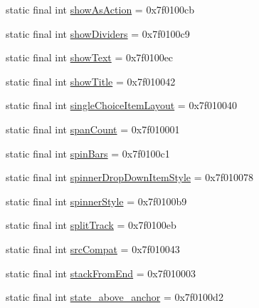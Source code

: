 \begin{CompactItemize}
\item 
static final int \hyperlink{classandroid_1_1support_1_1v7_1_1recyclerview_1_1_r_1_1attr_c968408fd2b62031f0d570d80099277d}{showAsAction} = 0x7f0100cb
\item 
static final int \hyperlink{classandroid_1_1support_1_1v7_1_1recyclerview_1_1_r_1_1attr_ac1710dac02f10a25d240e4053510474}{showDividers} = 0x7f0100c9
\item 
static final int \hyperlink{classandroid_1_1support_1_1v7_1_1recyclerview_1_1_r_1_1attr_340febbd8c8ff19124695033ff537e6f}{showText} = 0x7f0100ec
\item 
static final int \hyperlink{classandroid_1_1support_1_1v7_1_1recyclerview_1_1_r_1_1attr_da4b45088744653f30ee7b49cad0b15b}{showTitle} = 0x7f010042
\item 
static final int \hyperlink{classandroid_1_1support_1_1v7_1_1recyclerview_1_1_r_1_1attr_3668a9127cf32623817179d35f58f1b5}{singleChoiceItemLayout} = 0x7f010040
\item 
static final int \hyperlink{classandroid_1_1support_1_1v7_1_1recyclerview_1_1_r_1_1attr_4bcb72056cb55ba5a2d95cb14c6bd950}{spanCount} = 0x7f010001
\item 
static final int \hyperlink{classandroid_1_1support_1_1v7_1_1recyclerview_1_1_r_1_1attr_afba810e0a4736dddd963565713eefea}{spinBars} = 0x7f0100c1
\item 
static final int \hyperlink{classandroid_1_1support_1_1v7_1_1recyclerview_1_1_r_1_1attr_2a3b9afca71a7c0bb792c6c7ff64828d}{spinnerDropDownItemStyle} = 0x7f010078
\item 
static final int \hyperlink{classandroid_1_1support_1_1v7_1_1recyclerview_1_1_r_1_1attr_fae4501ae9f1ca3c650256e8af893aec}{spinnerStyle} = 0x7f0100b9
\item 
static final int \hyperlink{classandroid_1_1support_1_1v7_1_1recyclerview_1_1_r_1_1attr_8e2c92cb3138805145e8120cb089ecd8}{splitTrack} = 0x7f0100eb
\item 
static final int \hyperlink{classandroid_1_1support_1_1v7_1_1recyclerview_1_1_r_1_1attr_6427e2489471de94d0ec1e7593f32b8b}{srcCompat} = 0x7f010043
\item 
static final int \hyperlink{classandroid_1_1support_1_1v7_1_1recyclerview_1_1_r_1_1attr_43dfa7905b265e45d3e6f684d8c85c98}{stackFromEnd} = 0x7f010003
\item 
static final int \hyperlink{classandroid_1_1support_1_1v7_1_1recyclerview_1_1_r_1_1attr_ffd878401e6706e5a0b754b28fec2720}{state\_\-above\_\-anchor} = 0x7f0100d2
\item 

\end{CompactItemize}
